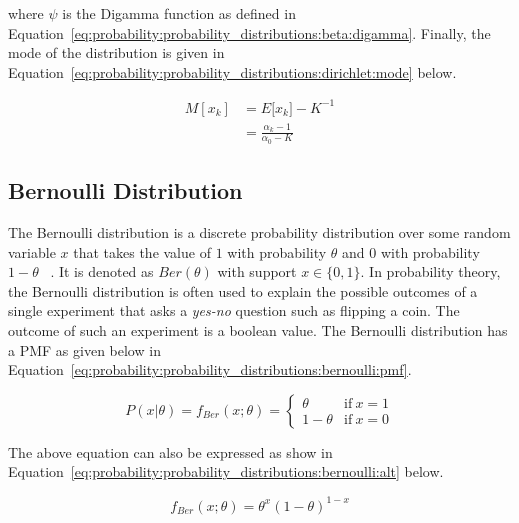 where $\psi$ is the Digamma function as defined in Equation~\eqref{eq:probability:probability_distributions:beta:digamma}. Finally, the mode of the distribution is given in Equation~\eqref{eq:probability:probability_distributions:dirichlet:mode} below.

\begin{equation}
      \label{eq:probability:probability_distributions:dirichlet:mode}
      \begin{split}
            M[x_{k}] &= E[{x_{k}] -K^{-1}} \\
            &=  \frac{\alpha_{k} - 1}{\alpha_{0} - K}
      \end{split}
\end{equation}


\subsection{Bernoulli Distribution}
\label{sec:probability:probability_distributions:bernoulli}

The Bernoulli distribution is a discrete probability distribution over some random variable $x$ that takes the value of $1$ with probability $\theta$ and $0$ with probability $1-\theta$ ~\cite{ref:wackerly:2014}. It is denoted as $Ber(\theta)$ with support $x \in \{0, 1\}$. In probability theory, the Bernoulli distribution is often used to explain the possible outcomes of a single experiment that asks a \textit{yes-no} question such as flipping a coin. The outcome of such an experiment is a boolean value. The Bernoulli distribution has a \ac{PMF} as given below in Equation~\eqref{eq:probability:probability_distributions:bernoulli:pmf}.

\begin{equation}
      \label{eq:probability:probability_distributions:bernoulli:pmf}
      P(x \vert \theta) = f_{Ber}(x; \theta) =
      \begin{cases}
            \theta     & \text{if}\ x=1 \\
            1 - \theta & \text{if}\ x=0
      \end{cases}
\end{equation}

The above equation can also be expressed as show in Equation~\eqref{eq:probability:probability_distributions:bernoulli:alt} below.

\begin{equation}
      \label{eq:probability:probability_distributions:bernoulli:alt}
      f_{Ber}(x; \theta) = \theta^{x}(1-\theta)^{1-x}
\end{equation}

